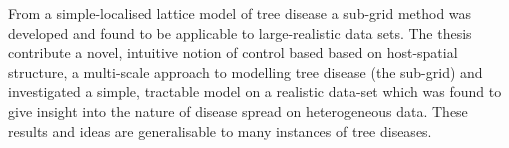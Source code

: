 From a simple-localised lattice model of tree disease a sub-grid method was developed and found to be applicable to large-realistic data sets. The thesis contribute a novel, intuitive notion of control based based on host-spatial structure, a multi-scale approach to modelling tree disease (the sub-grid) and investigated a simple, tractable model on a realistic data-set which was found to give insight into the nature of disease spread on heterogeneous data. These results and ideas are generalisable to many instances of tree diseases.
